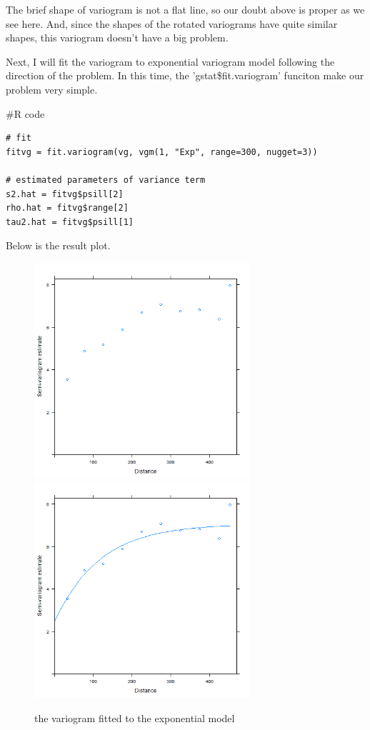 \documentclass{article}
\newenvironment{Rcode}%
{%
    \begin{mdframed}
    \#R code
    \begin{small}
}
{%
    \end{small}
    \end{mdframed}
}
\begin{document}
The brief shape of variogram is not a flat line, so our doubt above is proper as we see here.
And, since the shapes of the rotated variograms have quite similar shapes, this variogram doesn't have a big problem.

Next, I will fit the variogram to exponential variogram model following the direction of the problem.
In this time, the 'gstat\$fit.variogram' funciton make our problem very simple.

\begin{Rcode}
    \begin{verbatim}
# fit
fitvg = fit.variogram(vg, vgm(1, "Exp", range=300, nugget=3)) 

# estimated parameters of variance term
s2.hat = fitvg$psill[2]
rho.hat = fitvg$range[2]
tau2.hat = fitvg$psill[1]
    \end{verbatim}
\end{Rcode}

Below is the result plot.

\begin{figure}[!h]
    \centering
    \includegraphics[height=8cm]{prob2_CAtemp_variogram.png}
    \includegraphics[height=8cm]{prob2_CAtemp_variogram_exp_fit.png}
    \caption{the variogram fitted to the exponential model}
\end{figure}
\end{document}
